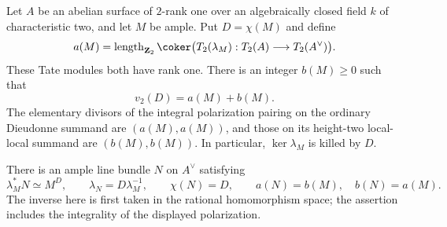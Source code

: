 \begin{lemma}
\label{lem:DE-A3-mixed-polarization-blocks}
Let $A$ be an abelian surface of $2$-rank one over an algebraically
closed field $k$ of characteristic two, and let $M$ be ample.
Put $D=\chi(M)$ and define
\[
 a(M)=\operatorname{length}_{\mathbf Z_2}
       \coker\bigl(T_2(\lambda_M):T_2(A)\longrightarrow T_2(A^\vee)\bigr).
\]
These Tate modules both have rank one.  There is an integer $b(M)\ge0$
such that
\[
                         v_2(D)=a(M)+b(M).
\]
The elementary divisors of the integral polarization pairing on the
ordinary Dieudonne summand are $(a(M),a(M))$, and those on its
height-two local-local summand are $(b(M),b(M))$.  In particular,
$\ker\lambda_M$ is killed by $D$.

There is an ample line bundle $N$ on $A^\vee$ satisfying
\[
 \lambda_M^*N\simeq M^D,\qquad
 \lambda_N=D\lambda_M^{-1},\qquad
 \chi(N)=D,\qquad
             a(N)=b(M),\quad b(N)=a(M).
\]
The inverse here is first taken in the rational homomorphism space;
the assertion includes the integrality of the displayed polarization.
\end{lemma}
